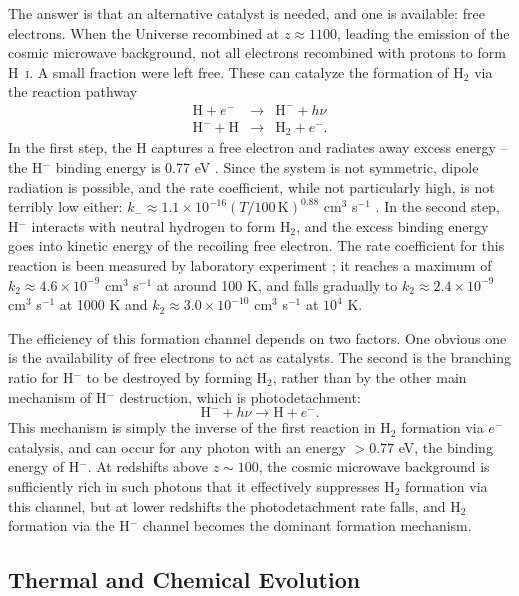The answer is that an alternative catalyst is needed, and one is available: free electrons. When the Universe recombined at $z\approx 1100$, leading the emission of the cosmic microwave background, not all electrons recombined with protons to form H~\textsc{i}. A small fraction were left free. These can catalyze the formation of H$_2$ via the reaction pathway
\begin{eqnarray}
\mathrm{H} + e^- & \rightarrow & \mathrm{H}^- + h\nu \\
\mathrm{H}^- + \mathrm{H} & \rightarrow & \mathrm{H}_2 + e^-.
\end{eqnarray}
In the first step, the H captures a free electron and radiates away excess energy -- the H$^-$ binding energy is 0.77 eV \citep{weisner64a}. Since the system is not symmetric, dipole radiation is possible, and the rate coefficient, while not particularly high, is not terribly low either: $k_{-} \approx 1.1\times 10^{-16}(T/100\,\mathrm{K})^{0.88}$ cm$^3$ s$^{-1}$ \citep{glover08a}. In the second step, H$^{-}$ interacts with neutral hydrogen to form H$_2$, and the excess binding energy goes into kinetic energy of the recoiling free electron. The rate coefficient for this reaction is been measured by laboratory experiment \citep{kreckel10a}; it reaches a maximum of $k_2 \approx 4.6\times 10^{-9}$ cm$^3$ s$^{-1}$ at around 100 K, and falls gradually to $k_2\approx 2.4\times 10^{-9}$ cm$^3$ s$^{-1}$ at 1000 K and $k_2\approx 3.0\times 10^{-10}$ cm$^3$ s$^{-1}$ at $10^4$ K.

The efficiency of this formation channel depends on two factors. One obvious one is the availability of free electrons to act as catalysts. The second is the branching ratio for H$^-$ to be destroyed by forming H$_2$, rather than by the other main mechanism of H$^-$ destruction, which is photodetachment:
\begin{equation}
\mathrm{H}^- + h\nu \rightarrow \mathrm{H} + e^{-}.
\end{equation}
This mechanism is simply the inverse of the first reaction in H$_2$ formation via $e^-$ catalysis, and can occur for any photon with an energy $>0.77$ eV, the binding energy of H$^-$. At redshifts above $z\sim 100$, the cosmic microwave background is sufficiently rich in such photons that it effectively suppresses H$_2$ formation via this channel, but at lower redshifts the photodetachment rate falls, and H$_2$ formation via the H$^-$ channel becomes the dominant formation mechanism.

\subsection{Thermal and Chemical Evolution}

